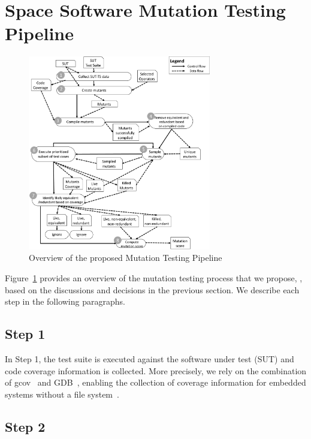 \section{Space Software Mutation Testing Pipeline}
\label{sec:approach}

\begin{figure}[tb]
\begin{center}
\includegraphics[width=8cm]{images/Approach}
\caption{Overview of the proposed Mutation Testing Pipeline}
\label{fig:approach}
\end{center}
\end{figure}

Figure~\ref{fig:approach} provides an overview of the mutation testing process that we propose, \APPR, based on the discussions and decisions in the previous section. We describe each step in the following paragraphs. 

\subsection{Step 1}

In Step 1, the test suite is executed against the software under test (SUT) and code coverage information is collected. 
More precisely, we rely on the combination of gcov~\cite{GCOV}
and GDB~\cite{GDB}, enabling the collection of coverage information for embedded systems without a file system~\cite{THANASSIS}.

\subsection{Step 2}

